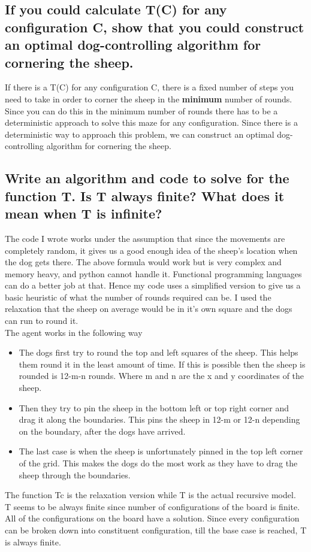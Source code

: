 \documentclass[11pt]{scrartcl} %
\begin{document}
\subsection{If you could calculate T(C) for any configuration C, show that you could construct an optimal dog-controlling algorithm for cornering the sheep.}
If there is a T(C) for any configuration C, there is a fixed number of steps you need to take in order to corner the sheep in the \textbf{minimum} number of rounds. Since you can do this in the minimum number of rounds there has to be a deterministic approach to solve this maze for any configuration. Since there is a deterministic way to approach this problem, we can construct an optimal dog-controlling algorithm for cornering the sheep. 

\subsection{Write an algorithm and code to solve for the function T.  Is T always finite?  What does it mean when T is infinite?}
The code I wrote works under the assumption that since the movements are completely random, it gives us a good enough idea of the sheep's location when the dog gets there. The above formula would work but is very complex and memory heavy, and python cannot handle it. Functional programming languages can do a better job at that. Hence my code uses a simplified version to give us a basic heuristic of what the number of rounds required can be. I used the relaxation that the sheep on average would be in it's own square and the dogs can run to round it. \\
The agent works in the following way
\begin{itemize}
\item The dogs first try to round the top and left squares of the sheep. This helps them round it in the least amount of time. If this is possible then the sheep is rounded is 12-m-n rounds. Where m and n are the x and y coordinates of the sheep. 
\item Then they try to pin the sheep in the bottom left or top right corner and drag it along the boundaries. This pins the sheep in 12-m or 12-n depending on the boundary, after the dogs have arrived. 
\item The last case is when the sheep is unfortunately pinned in the top left corner of the grid. This makes the dogs do the most work as they have to drag the sheep through the boundaries.  
\end{itemize}
The function Tc is the relaxation version while T is the actual recursive model.\\
T seems to be always finite since number of configurations of the board is finite. All of the configurations on the board have a solution. Since every configuration can be broken down into constituent configuration, till the base case is reached, T is always finite. 
\end{document}
